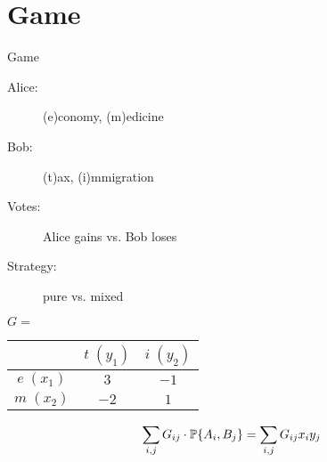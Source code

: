 \section{Game}

\begin{frame}{Game}
  \begin{description}
	\item[Alice:] (e)conomy, (m)edicine
	\item[Bob:] (t)ax, (i)mmigration
	\item[Votes:] Alice gains vs. Bob loses
	\item[Strategy:] pure vs. mixed
  \end{description}

  \vspace{0.20cm}

  \begin{center}
	$G=$ \begin{tabular}{|c|cc|}
	  \hline
	  &	$t\; (y_1)$	&	$i\; (y_2)$	\\ \hline
	  $e\; (x_1)$	&	$3$	&	$-1$	\\
	  $m\; (x_2)$	&	$-2$	&	$1$	\\ \hline
	\end{tabular}
  \end{center}

  \[
	\sum_{i,j} G_{ij} \cdot \mathbb{P}\{A_i, B_j\} = \sum_{i,j} G_{ij} x_i y_j
  \]

  \begin{center}
	\\[20pt]
  \end{center}
\end{frame}

